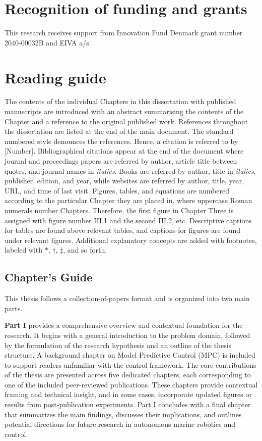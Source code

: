 \section*{Recognition of funding and grants}
This research receives support from Innovation Fund Denmark grant number 2040-00032B and EIVA a/s.

\section*{Reading guide}
The contents of the individual Chapters in this dissertation with published manuscripts are introduced with an abstract summarising the contents of the Chapter and a reference to the original published work. References throughout the dissertation are listed at the end of the main document. The standard numbered style denounces the references. Hence, a citation is referred to by [Number]. Bibliographical citations appear at the end of the document where journal and proceedings papers are referred by author, article title between quotes, and journal names in \textit{italics}. Books are referred by author, title in \textit{italics}, publisher, edition, and year, while websites are referred by author, title, year, URL, and time of last visit. Figures, tables, and equations are numbered according to the particular Chapter they are placed in, where uppercase Roman numerals number Chapters. Therefore, the first figure in Chapter Three is assigned with figure number III.1 and the second III.2, etc. Descriptive captions for tables are found above relevant tables, and captions for figures are found under relevant figures. Additional explanatory concepts are added with footnotes, labeled with $\ast$, $\dagger$, $\ddagger$, and so forth.

\subsection*{Chapter's Guide}
This thesis follows a collection-of-papers format and is organized into two main parts. 

\textbf{Part I} provides a comprehensive overview and contextual foundation for the research. It begins with a general introduction to the problem domain, followed by the formulation of the research hypothesis and an outline of the thesis structure. A background chapter on Model Predictive Control (\ac{MPC}) is included to support readers unfamiliar with the control framework. The core contributions of the thesis are presented across five dedicated chapters, each corresponding to one of the included peer-reviewed publications. These chapters provide contextual framing and technical insight, and in some cases, incorporate updated figures or results from post-publication experiments. Part I concludes with a final chapter that summarizes the main findings, discusses their implications, and outlines potential directions for future research in autonomous marine robotics and control.

